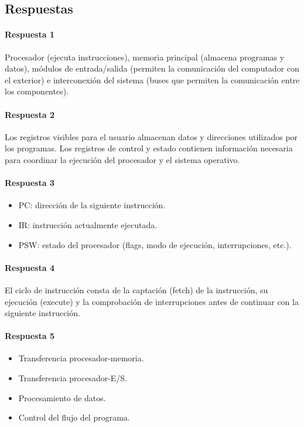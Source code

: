 \subsection*{Respuestas}

\paragraph{Respuesta 1} Procesador (ejecuta instrucciones), memoria principal (almacena programas y datos), módulos de entrada/salida (permiten la comunicación del computador con el exterior) e interconexión del sistema (buses que permiten la comunicación entre los componentes).

\paragraph{Respuesta 2} Los registros visibles para el usuario almacenan datos y direcciones utilizados por los programas. Los registros de control y estado contienen información necesaria para coordinar la ejecución del procesador y el sistema operativo.

\paragraph{Respuesta 3}
\begin{itemize}
  \item PC: dirección de la siguiente instrucción.
  \item IR: instrucción actualmente ejecutada.
  \item PSW: estado del procesador (flags, modo de ejecución, interrupciones, etc.).
\end{itemize}

\paragraph{Respuesta 4} El ciclo de instrucción consta de la captación (fetch) de la instrucción, su ejecución (execute) y la comprobación de interrupciones antes de continuar con la siguiente instrucción.

\paragraph{Respuesta 5}
\begin{itemize}
  \item Transferencia procesador-memoria.
  \item Transferencia procesador-E/S.
  \item Procesamiento de datos.
  \item Control del flujo del programa.
\end{itemize}

